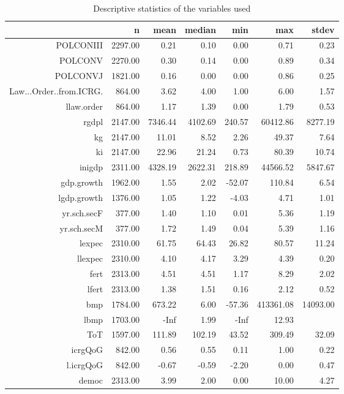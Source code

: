 \documentclass{article}\usepackage{graphicx, color}
\begin{document}
\begin{table}
\centering
\begin{tabular}{rrrrrrr}
  \hline
 & n & mean & median & min & max & stdev \\ 
  \hline
POLCONIII & 2297.00 & 0.21 & 0.10 & 0.00 & 0.71 & 0.23 \\ 
  POLCONV & 2270.00 & 0.30 & 0.14 & 0.00 & 0.89 & 0.34 \\ 
  POLCONVJ & 1821.00 & 0.16 & 0.00 & 0.00 & 0.86 & 0.25 \\ 
  Law...Order..from.ICRG. & 864.00 & 3.62 & 4.00 & 1.00 & 6.00 & 1.57 \\ 
  llaw.order & 864.00 & 1.17 & 1.39 & 0.00 & 1.79 & 0.53 \\ 
  rgdpl & 2147.00 & 7346.44 & 4102.69 & 240.57 & 60412.86 & 8277.19 \\ 
  kg & 2147.00 & 11.01 & 8.52 & 2.26 & 49.37 & 7.64 \\ 
  ki & 2147.00 & 22.96 & 21.24 & 0.73 & 80.39 & 10.74 \\ 
  inigdp & 2311.00 & 4328.19 & 2622.31 & 218.89 & 44566.52 & 5847.67 \\ 
  gdp.growth & 1962.00 & 1.55 & 2.02 & -52.07 & 110.84 & 6.54 \\ 
  lgdp.growth & 1376.00 & 1.05 & 1.22 & -4.03 & 4.71 & 1.01 \\ 
  yr.sch.secF & 377.00 & 1.40 & 1.10 & 0.01 & 5.36 & 1.19 \\ 
  yr.sch.secM & 377.00 & 1.72 & 1.49 & 0.04 & 5.39 & 1.16 \\ 
  lexpec & 2310.00 & 61.75 & 64.43 & 26.82 & 80.57 & 11.24 \\ 
  llexpec & 2310.00 & 4.10 & 4.17 & 3.29 & 4.39 & 0.20 \\ 
  fert & 2313.00 & 4.51 & 4.51 & 1.17 & 8.29 & 2.02 \\ 
  lfert & 2313.00 & 1.38 & 1.51 & 0.16 & 2.12 & 0.52 \\ 
  bmp & 1784.00 & 673.22 & 6.00 & -57.36 & 413361.08 & 14093.00 \\ 
  lbmp & 1703.00 & -Inf & 1.99 & -Inf & 12.93 &  \\ 
  ToT & 1597.00 & 111.89 & 102.19 & 43.52 & 309.49 & 32.09 \\ 
  icrgQoG & 842.00 & 0.56 & 0.55 & 0.11 & 1.00 & 0.22 \\ 
  l.icrgQoG & 842.00 & -0.67 & -0.59 & -2.20 & 0.00 & 0.47 \\ 
  democ & 2313.00 & 3.99 & 2.00 & 0.00 & 10.00 & 4.27 \\ 
   \hline
\end{tabular}
\caption{Descriptive statistics of the variables used} 
\label{tabsmall}
\end{table}
\end{document}
